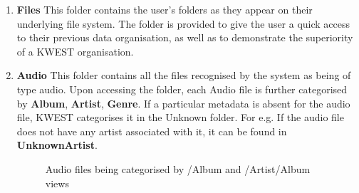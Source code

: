 \begin{enumerate}
\item \textbf{Files} \newline
This folder contains the user's folders as they  appear on their underlying file system. The folder is provided to give the user a quick access to their previous data organisation, as well as to demonstrate the superiority of a KWEST organisation.
\item \textbf{Audio} \newline
This folder contains all the files recognised by the system as being of type audio. Upon accessing the folder, each Audio file is further categorised by \textbf{Album}, \textbf{Artist}, \textbf{Genre}. If a particular metadata is absent for the audio file, KWEST categorises it in the Unknown folder. \newline
For e.g. If the audio file does not have any artist associated with it, it can be found in \textbf{UnknownArtist}.
\begin{figure}[htb]
\centering
\setlength\fboxsep{0pt}
\setlength\fboxrule{0.5pt}
\caption{Audio files being categorised by /Album and /Artist/Album views}
\label{fig:dfd0}
\end{figure}


\end{enumerate}

